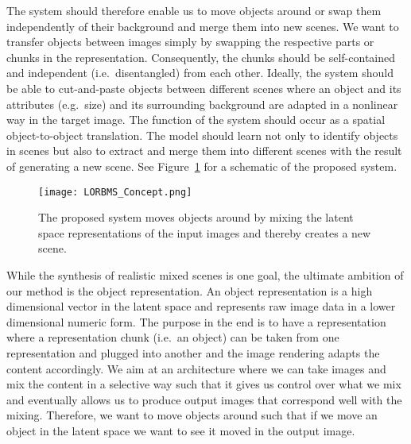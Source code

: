\documentclass[a4paper,12pt]{report}
\begin{document}
The system should therefore enable us to move objects around or swap them independently of their background and merge them into new scenes. We want to transfer objects between images simply by swapping the respective parts or chunks in the representation. Consequently, the chunks should be self-contained and independent (i.e.\ disentangled) from each other. Ideally, the system should be able to cut-and-paste objects between different scenes where an object and its attributes (e.g.\ size) and its surrounding background are adapted in a nonlinear way in the target image. The function of the system should occur as a spatial object-to-object translation. The model should learn not only to identify objects in scenes but also to extract and merge them into different scenes with the result of generating a new scene. See Figure~\ref{fig:concet_lorbms} for a schematic of the proposed system.
\begin{figure}[ht]
\centering
\texttt{[image: LORBMS\_Concept.png]}
\caption[Concept of the proposed system.]{The proposed system moves objects around by mixing the latent space representations of the input images and thereby creates a new scene.}
\label{fig:concet_lorbms}
\end{figure}
While the synthesis of realistic mixed scenes is one goal, the ultimate ambition of our method is the object representation. An object representation is a high dimensional vector in the latent space and represents raw image data in a lower dimensional numeric form. The purpose in the end is to have a representation where a representation chunk (i.e.\ an object) can be taken from one representation and plugged into another and the image rendering adapts the content accordingly. We aim at an architecture where we can take images and mix the content in a selective way such that it gives us control over what we mix and eventually allows us to produce output images that correspond well with the mixing. Therefore, we want to move objects around such that if we move an object in the latent space we want to see it moved in the output image. 
\end{document}
